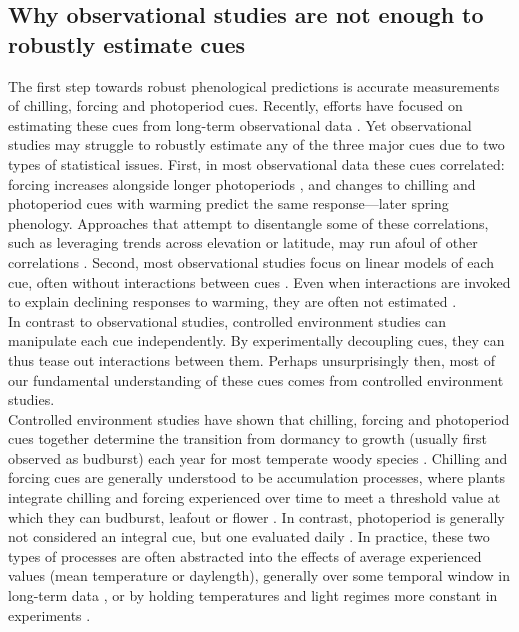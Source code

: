 \documentclass[11pt,letter]{article}
\begin{document}
\subsection{Why observational studies are not enough to robustly estimate cues}
The first step towards robust phenological predictions is accurate measurements of chilling, forcing and photoperiod cues. Recently, efforts have focused on estimating these cues from long-term observational data \citep{Luedeling2009,lued2013diff}. Yet observational studies may struggle to robustly estimate any of the three major cues due to two types of statistical issues. First, in most observational data these cues correlated: forcing increases alongside longer photoperiods \citep{sarahailene2020}, and changes to chilling and photoperiod cues with warming predict the same response---later spring phenology. Approaches that attempt to disentangle some of these correlations, such as leveraging trends across elevation or latitude, may run afoul of other correlations \citep[][]{tansey2017}. Second, most observational studies focus on linear models of each cue, often without interactions between cues \citep{visser2001,polgar2014}. Even when interactions are invoked to explain declining responses to warming, they are often not estimated \citep[e.g.,][]{fu2015,asse2018}.\\

In contrast to observational studies, controlled environment studies can manipulate each cue independently. By experimentally decoupling cues, they can thus tease out interactions between them. Perhaps unsurprisingly then, most of our fundamental understanding of these cues comes from controlled environment studies.\\

Controlled environment studies have shown that chilling, forcing and photoperiod cues together determine the transition from dormancy to growth (usually first observed as budburst) each year for most temperate woody species \citep{vanderschoot2014,chuinearees,Singh:2017,ettinger2020,chang2021}. Chilling and forcing cues are generally understood to be accumulation processes, where plants integrate chilling and forcing experienced over time to meet a threshold value at which they can budburst, leafout or flower \citep{Chuine2000}. In contrast, photoperiod is generally not considered an integral cue, but one evaluated daily \citep{Singh:2017}. In practice, these two types of processes are often abstracted into the effects of average experienced values (mean temperature or daylength), generally over some temporal window in long-term data \citep[e.g.,][]{Wolkovich:2012n,fu2015}, or by holding temperatures and light regimes more constant in experiments \citep[e.g.,][]{Worrall:1967aa,Heide:1993,Heide:1993a,Skuterud:1994aa}. \\ %
\end{document}
